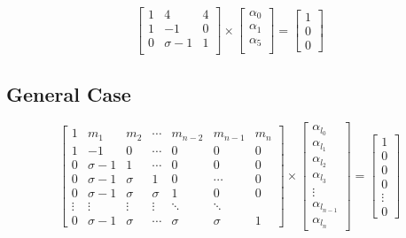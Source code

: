 \begin{equation}
{
\left[ \begin{array}{ccc}
1 & 4 & 4 \\
1 & -1 & 0\\
0 & \sigma-1 & 1\\
\end{array} 
\right ]} \times \left[ \begin{array}{c}
\alpha_{0} \\
\alpha_{1} \\
\alpha_{5} \\
\end{array} 
\right ] = \left[ \begin{array}{c}
1 \\
0 \\
0 
\end{array} 
\right ]
\end{equation}


\subsection{General Case}
\begin{equation}
{
\left[ \begin{array}{ccccccc}
1 & m_{1} & m_{2} & \cdots & m_{n-2} & m_{n-1} & m_{n}\\
1 & -1 & 0 & \cdots& 0 & 0 & 0\\
0 & \sigma -1 & 1 & \cdots & 0 & 0 & 0 \\
0 & \sigma -1 & \sigma & 1 & 0 & \cdots & 0 \\
0 & \sigma -1 & \sigma & \sigma & 1 & 0 & 0 \\
\vdots & \vdots & \vdots  &   \vdots & \ddots & \ddots\\
0 & \sigma -1 & \sigma & \cdots & \sigma & \sigma & 1
\end{array} 
\right ]} \times \left[ \begin{array}{c}
\alpha_{l_{0}} \\
\alpha_{l_{1}} \\
\alpha_{l_{2}} \\
\alpha_{l_{3}} \\
\vdots \\
\alpha_{l_{n-1}}\\
\alpha_{l_{n}}
\end{array} 
\right ] = \left[ \begin{array}{c}
1 \\
0 \\
0 \\
0 \\
\vdots \\
0
\end{array} 
\right ]
\end{equation}










